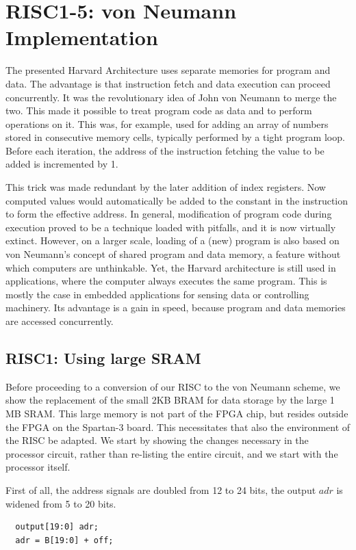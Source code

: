 \section{RISC1-5: von Neumann Implementation}
\label{ch:von}
The presented Harvard Architecture uses separate memories for program and data. The advantage
is that instruction fetch and data execution can proceed concurrently. It was the revolutionary idea
of John von Neumann to merge the two. This made it possible to treat program code as data and to
perform operations on it. This was, for example, used for adding an array of numbers stored in
consecutive memory cells, typically performed by a tight program loop. Before each iteration, the
address of the instruction fetching the value to be added is incremented by 1.

This trick was made redundant by the later addition of index registers. Now computed values would
automatically be added to the constant in the instruction to form the effective address. In general,
modification of program code during execution proved to be a technique loaded with pitfalls, and it
is now virtually extinct. However, on a larger scale, loading of a (new) program is also based on
von Neumann’s concept of shared program and data memory, a feature without which computers are
unthinkable. Yet, the Harvard architecture is still used in applications, where the computer always
executes the same program. This is mostly the case in embedded applications for sensing data or
controlling machinery. Its advantage is a gain in speed, because program and data memories are
accessed concurrently.

\subsection{RISC1: Using large SRAM}
\label{sec:sram}
Before proceeding to a conversion of our RISC to the von Neumann scheme, we show the replacement of
the small 2KB BRAM for data storage by the large 1 MB SRAM. This large memory is not part of the
FPGA chip, but resides outside the FPGA on the Spartan-3 board. This necessitates that also the
environment of the RISC be adapted. We start by showing the changes necessary in the processor
circuit, rather than re-listing the entire circuit, and we start with the processor itself.

First of all, the address signals are doubled from 12 to 24 bits, the output $adr$ is widened from 5
to 20 bits.
\begin{verbatim}
  output[19:0] adr;
  adr = B[19:0] + off;
\end{verbatim}

